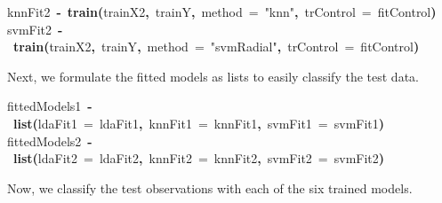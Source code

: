 \documentclass{article}
\makeatletter
\newcommand{\hlfunctioncall}[1]{\textcolor[rgb]{.5,0,.33}{\textbf{#1}}}%
\newcommand{\hlstring}[1]{\textcolor[rgb]{.6,.6,1}{#1}}%
\newcommand{\hlkeyword}[1]{\textbf{#1}}%
\newcommand{\hlargument}[1]{\textcolor[rgb]{.69,.25,.02}{#1}}%
\newcommand{\hlassignement}[1]{\textbf{#1}}%
\newcommand{\hlsymbol}[1]{#1}%
\newcommand{\hlstd}[1]{\textcolor[rgb]{0,0,0}{#1}}%
\newenvironment{kframe}{%
 \def\FrameCommand##1{\hskip\@totalleftmargin \hskip-\fboxsep
 \colorbox{shadecolor}{##1}\hskip-\fboxsep
     \hskip-\linewidth \hskip-\@totalleftmargin \hskip\columnwidth}%
 \MakeFramed {\advance\hsize-\width
   \@totalleftmargin\z@ \linewidth\hsize
   \@setminipage}}%
 {\par\unskip\endMakeFramed}
\newenvironment{knitrout}{}{} %
\makeatother
\begin{document}
\begin{knitrout}
\begin{kframe}
\begin{flushleft}
\hlstd{}\hlsymbol{knnFit2}{\ }\hlassignement{\usebox{\hlnormalsizeboxlessthan}-}{\ }\hlfunctioncall{train}\hlkeyword{(}\hlsymbol{trainX2}\hlkeyword{,}{\ }\hlsymbol{trainY}\hlkeyword{,}{\ }\hlargument{method}{\ }\hlargument{=}{\ }\hlstring{"{}knn"{}}\hlkeyword{,}{\ }\hlargument{trControl}{\ }\hlargument{=}{\ }\hlsymbol{fitControl}\hlkeyword{)}\hspace*{\fill}\\
\hlstd{}\hlsymbol{svmFit2}{\ }\hlassignement{\usebox{\hlnormalsizeboxlessthan}-}{\ }\hlfunctioncall{train}\hlkeyword{(}\hlsymbol{trainX2}\hlkeyword{,}{\ }\hlsymbol{trainY}\hlkeyword{,}{\ }\hlargument{method}{\ }\hlargument{=}{\ }\hlstring{"{}svmRadial"{}}\hlkeyword{,}{\ }\hlargument{trControl}{\ }\hlargument{=}{\ }\hlsymbol{fitControl}\hlkeyword{)}\mbox{}
\normalfont
\end{flushleft}
\end{kframe}
\end{knitrout}


Next, we formulate the fitted models as lists to easily classify the test data.

\begin{knitrout}
\color{fgcolor}\begin{kframe}
\begin{flushleft}
\ttfamily\noindent
\hlsymbol{fittedModels1}{\ }\hlassignement{\usebox{\hlnormalsizeboxlessthan}-}{\ }\hlfunctioncall{list}\hlkeyword{(}\hlargument{ldaFit1}{\ }\hlargument{=}{\ }\hlsymbol{ldaFit1}\hlkeyword{,}{\ }\hlargument{knnFit1}{\ }\hlargument{=}{\ }\hlsymbol{knnFit1}\hlkeyword{,}{\ }\hlargument{svmFit1}{\ }\hlargument{=}{\ }\hlsymbol{svmFit1}\hlkeyword{)}\hspace*{\fill}\\
\hlstd{}\hlsymbol{fittedModels2}{\ }\hlassignement{\usebox{\hlnormalsizeboxlessthan}-}{\ }\hlfunctioncall{list}\hlkeyword{(}\hlargument{ldaFit2}{\ }\hlargument{=}{\ }\hlsymbol{ldaFit2}\hlkeyword{,}{\ }\hlargument{knnFit2}{\ }\hlargument{=}{\ }\hlsymbol{knnFit2}\hlkeyword{,}{\ }\hlargument{svmFit2}{\ }\hlargument{=}{\ }\hlsymbol{svmFit2}\hlkeyword{)}\mbox{}
\normalfont
\end{flushleft}
\end{kframe}
\end{knitrout}


Now, we classify the test observations with each of the six trained models.
\end{document}
